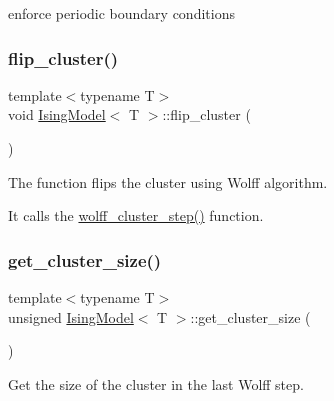 enforce periodic boundary conditions 

\mbox{\label{classIsingModel_ab76a4eee808eaa1979ff6707498e9908}} 
\subsubsection{\texorpdfstring{flip\+\_\+cluster()}{flip\_cluster()}}
{\footnotesize\ttfamily template$<$typename T$>$ \\
void \mbox{\hyperlink{classIsingModel}{Ising\+Model}}$<$ T $>$\+::flip\+\_\+cluster (\begin{DoxyParamCaption}{ }\end{DoxyParamCaption})\hspace{0.3cm}{\ttfamily [inline]}}



The function flips the cluster using Wolff algorithm. 

It calls the \mbox{\hyperlink{classIsingModel_a37758a1a4a2536d16f1bb8166e13f7b6}{wolff\+\_\+cluster\+\_\+step()}} function. \mbox{\label{classIsingModel_afd731e5858b03deb1c8a11ee8a6b8834}} 
\subsubsection{\texorpdfstring{get\+\_\+cluster\+\_\+size()}{get\_cluster\_size()}}
{\footnotesize\ttfamily template$<$typename T$>$ \\
unsigned \mbox{\hyperlink{classIsingModel}{Ising\+Model}}$<$ T $>$\+::get\+\_\+cluster\+\_\+size (\begin{DoxyParamCaption}{ }\end{DoxyParamCaption})\hspace{0.3cm}{\ttfamily [inline]}}



Get the size of the cluster in the last Wolff step. 

\mbox{\label{classIsingModel_a37a7c509999f21f1bd4f54a12009f3cf}} 
